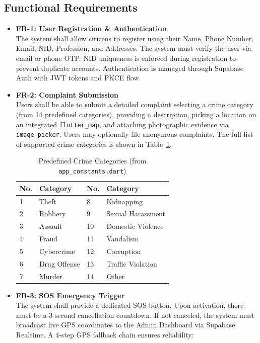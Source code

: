 \documentclass[12pt, a4paper, twoside]{report}
\begin{document}
\subsection{Functional Requirements}
\begin{itemize}
    \item \textbf{FR-1: User Registration \& Authentication}\\
    The system shall allow citizens to register using their Name, Phone Number, Email, NID, Profession, and Addresses. The system must verify the user via email or phone OTP. NID uniqueness is enforced during registration to prevent duplicate accounts. Authentication is managed through Supabase Auth with JWT tokens and PKCE flow.
    \item \textbf{FR-2: Complaint Submission}\\
    Users shall be able to submit a detailed complaint selecting a crime category (from 14 predefined categories), providing a description, picking a location on an integrated \texttt{flutter\_map}, and attaching photographic evidence via \texttt{image\_picker}. Users may optionally file anonymous complaints. The full list of supported crime categories is shown in Table~\ref{tab:categories}.
    \begin{table}[ht]
    \centering
    \caption{Predefined Crime Categories (from \texttt{app\_constants.dart})}
    \label{tab:categories}
    \begin{tabularx}{\textwidth}{X l X l}
    \toprule
    \textbf{No.} & \textbf{Category} & \textbf{No.} & \textbf{Category} \\
    \midrule
    1 & Theft & 8 & Kidnapping \\
    2 & Robbery & 9 & Sexual Harassment \\
    3 & Assault & 10 & Domestic Violence \\
    4 & Fraud & 11 & Vandalism \\
    5 & Cybercrime & 12 & Corruption \\
    6 & Drug Offense & 13 & Traffic Violation \\
    7 & Murder & 14 & Other \\
    \bottomrule
    \end{tabularx}
    \end{table}
    \item \textbf{FR-3: SOS Emergency Trigger}\\
    The system shall provide a dedicated SOS button. Upon activation, there must be a 3-second cancellation countdown. If not canceled, the system must broadcast live GPS coordinates to the Admin Dashboard via Supabase Realtime. A 4-step GPS fallback chain ensures reliability:

\end{itemize}
\end{document}
